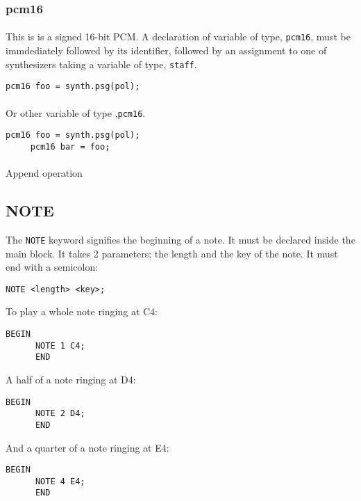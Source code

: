 \documentclass{article}
\begin{document}
\subsubsection{pcm16}
\paragraph{} This is is a signed 16-bit PCM. A declaration of variable of type,
\verb+pcm16+, must be immdediately followed by its identifier, followed by
an assignment to one of synthesizers taking a variable of type, \verb+staff+. 
\begin{Verbatim}[frame=single]
      pcm16 foo = synth.psg(pol);
\end{Verbatim}

\paragraph{} Or other variable of type ,\verb+pcm16+.
\begin{Verbatim}[frame=single]
     pcm16 foo = synth.psg(pol);
     pcm16 bar = foo;
\end{Verbatim}

\paragraph{} Append operation 
\subsection{NOTE}

The \verb+NOTE+ keyword signifies the beginning of a note. It must be declared
inside the main block.
It takes 2 parameters; the length and the key of the note. It must end with
a semicolon: 
\begin{Verbatim}[frame=single]
      NOTE <length> <key>;
\end{Verbatim}

To play a whole note ringing at C4:
\begin{Verbatim}[frame=single]
      BEGIN
      NOTE 1 C4;
      END
\end{Verbatim}
\newpage
A half of a note ringing at D4:
\begin{Verbatim}[frame=single]
      BEGIN
      NOTE 2 D4;
      END
\end{Verbatim}

And a quarter of a note ringing at E4:
\begin{Verbatim}[frame=single]
      BEGIN
      NOTE 4 E4;
      END
\end{Verbatim}
\end{document}
